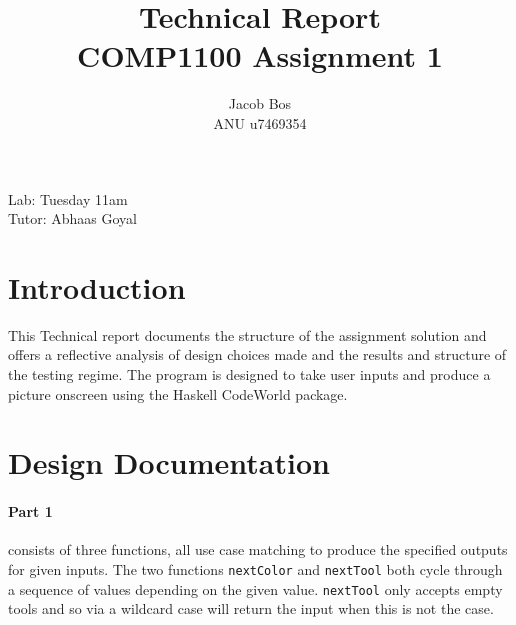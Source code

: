 \documentclass[11pt]{article}
\title{Technical Report\\ COMP1100 Assignment 1}
\author{Jacob Bos\\ ANU u7469354}
\begin{document}
\maketitle
{}
\begin{center}
  Lab: Tuesday 11am\\
  Tutor: Abhaas Goyal
\end{center}
\tableofcontents
\newpage
{}
\section{Introduction} 
This Technical report documents the structure of the assignment solution and offers a reflective analysis of design choices made and the results and structure of the testing regime. The program is designed to take user inputs and produce a picture onscreen using the Haskell CodeWorld package. %


\section{Design Documentation}%

\paragraph{Part 1} consists of three functions, all use case matching to produce the specified outputs for given inputs. The two functions \verb|nextColor| and  \verb|nextTool| both cycle through a sequence of values depending on the given value.  \verb|nextTool| only accepts empty tools and so via a wildcard case will return the input when this is not the case. %
\end{document}
